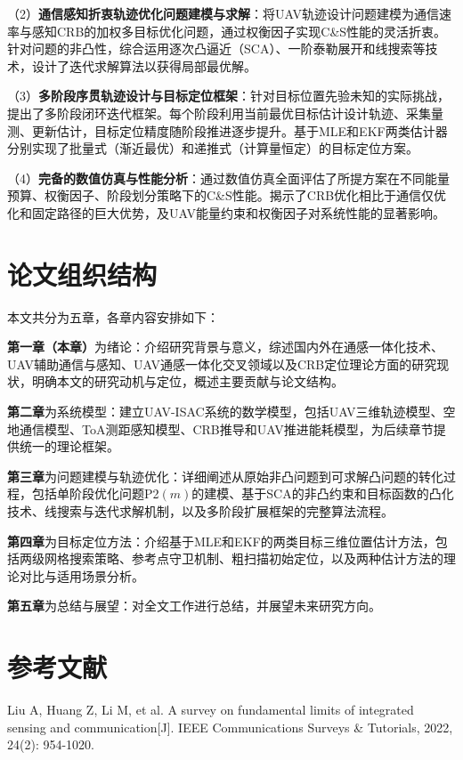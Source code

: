 （2）\textbf{通信感知折衷轨迹优化问题建模与求解}：将UAV轨迹设计问题建模为通信速率与感知CRB的加权多目标优化问题，通过权衡因子实现C\&S性能的灵活折衷。针对问题的非凸性，综合运用逐次凸逼近（SCA）、一阶泰勒展开和线搜索等技术，设计了迭代求解算法以获得局部最优解。

（3）\textbf{多阶段序贯轨迹设计与目标定位框架}：针对目标位置先验未知的实际挑战，提出了多阶段闭环迭代框架。每个阶段利用当前最优目标估计设计轨迹、采集量测、更新估计，目标定位精度随阶段推进逐步提升。基于MLE和EKF两类估计器分别实现了批量式（渐近最优）和递推式（计算量恒定）的目标定位方案。

（4）\textbf{完备的数值仿真与性能分析}：通过数值仿真全面评估了所提方案在不同能量预算、权衡因子、阶段划分策略下的C\&S性能。揭示了CRB优化相比于通信仅优化和固定路径的巨大优势，及UAV能量约束和权衡因子对系统性能的显著影响。

\section{论文组织结构}

本文共分为五章，各章内容安排如下：

\textbf{第一章（本章）}为绪论：介绍研究背景与意义，综述国内外在通感一体化技术、UAV辅助通信与感知、UAV通感一体化交叉领域以及CRB定位理论方面的研究现状，明确本文的研究动机与定位，概述主要贡献与论文结构。

\textbf{第二章}为系统模型：建立UAV-ISAC系统的数学模型，包括UAV三维轨迹模型、空地通信模型、ToA测距感知模型、CRB推导和UAV推进能耗模型，为后续章节提供统一的理论框架。

\textbf{第三章}为问题建模与轨迹优化：详细阐述从原始非凸问题到可求解凸问题的转化过程，包括单阶段优化问题P2$(m)$的建模、基于SCA的非凸约束和目标函数的凸化技术、线搜索与迭代求解机制，以及多阶段扩展框架的完整算法流程。

\textbf{第四章}为目标定位方法：介绍基于MLE和EKF的两类目标三维位置估计方法，包括两级网格搜索策略、参考点守卫机制、粗扫描初始定位，以及两种估计方法的理论对比与适用场景分析。

\textbf{第五章}为总结与展望：对全文工作进行总结，并展望未来研究方向。

\newpage
\section*{参考文献}

\noindent
[1]\quad Liu A, Huang Z, Li M, et al. A survey on fundamental limits of integrated sensing and communication[J]. IEEE Communications Surveys \& Tutorials, 2022, 24(2): 954-1020.

